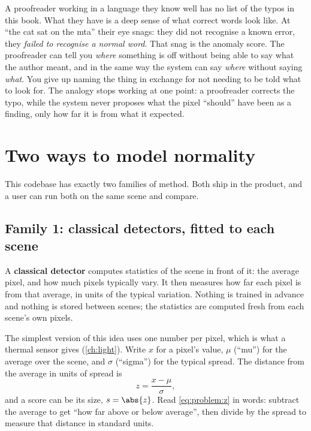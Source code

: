 \begin{analogy}
A proofreader working in a language they know well has no list of the typos in this book. What
they have is a deep sense of what correct words look like. At ``the cat sat on the mta'' their
eye snags: they did not recognise a known error, they \emph{failed to recognise a normal word}.
That snag is the anomaly score. The proofreader can tell you \emph{where} something is off without
being able to say what the author meant, and in the same way the system can say \emph{where}
without saying \emph{what}. You give up naming the thing in exchange for not needing to be told
what to look for. The analogy stops working at one point: a proofreader corrects the typo, while
the system never proposes what the pixel ``should'' have been as a finding, only how far it is
from what it expected.
\end{analogy}

\section{Two ways to model normality}\label{sec:problem:families}

This codebase has exactly two families of method. Both ship in the product, and a user can run
both on the same scene and compare.

\subsection{Family 1: classical detectors, fitted to each scene}

A \textbf{classical detector} computes statistics of the scene in
front of it: the average pixel, and how much pixels typically vary. It then measures how far each
pixel is from that average, in units of the typical variation. Nothing is trained in advance and
nothing is stored between scenes; the statistics are computed fresh from each scene's own pixels.

The simplest version of this idea uses one number per pixel, which is what a thermal sensor
gives (\cref{ch:light}). Write $x$ for a pixel's value, $\mu$ (``mu'') for the average over the
scene, and $\sigma$ (``sigma'') for the typical spread. The distance from the average in units of
spread is
\begin{equation}\label{eq:problem:z}
z = \frac{x - \mu}{\sigma},
\end{equation}
and a score can be its size, $s = \abs{z}$. Read \cref{eq:problem:z} in words: subtract the
average to get ``how far above or below average'', then divide by the spread to measure that
distance in standard units.

